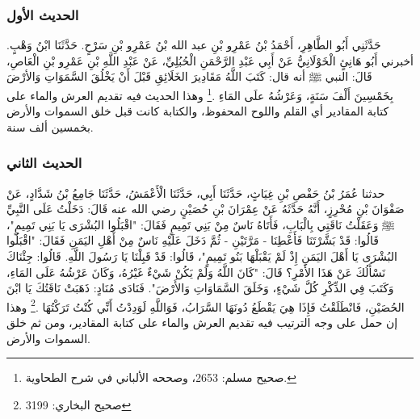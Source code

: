 \subsubsection{الحديث الأول}
\label{sec:app_first_creation_hadith_1}

حَدَّثَنِي أَبُو الطَّاهِرِ، أَحْمَدُ بْنُ عَمْرِو بْنِ عبد الله بْنُ عَمْرِو بْنِ سَرْحٍ. حَدَّثَنَا ابْنُ وَهْبٍ. أخبرني أَبُو هَانِئٍ الْخَوْلَانِيُّ عَنْ أَبِي عَبْدِ الرَّحْمَنِ الْحُبُلِيِّ، عَنْ عَبْدِ اللَّهِ بْنِ عَمْرِو بْنِ الْعَاصِ، قَالَ: النبي ﷺ أنه قال:  كَتَبَ اللَّهُ مَقَادِيرَ الخَلَائِقِ قَبْلَ أَنْ يَخْلُقَ السَّمَوَاتِ وَالأرْضَ بِخَمْسِينَ أَلْفَ سَنَةٍ، وَعَرْشُهُ علَى المَاءِ \href{https://shamela.ws/book/1727/6683#p2}{\faExternalLink} \cite{muslim}.\footnote{صحيح مسلم: 2653، وصححه الألباني في شرح الطحاوية.} وهذا الحديث فيه تقديم العرش والماء على كتابة المقادير أي القلم واللوح المحفوظ، والكتابة كانت قبل خلق السموات والأرض بخمسين ألف سنة.

\subsubsection{الحديث الثاني}
\label{sec:app_first_creation_hadith_2}

حدثنا عُمَرُ بْنُ حَفْصِ بْنِ غِيَاثٍ، حَدَّثَنَا أَبِي، حَدَّثَنَا الْأَعْمَشُ، حَدَّثَنَا جَامِعُ بْنُ شَدَّادٍ، عَنْ صَفْوَانَ بْنِ مُحْرِزٍ، أَنَّهُ حَدَّثَهُ عَنْ عِمْرَانَ بْنِ حُصَيْنٍ رضي الله عنه قَالَ: دَخَلْتُ عَلَى النَّبِيِّ ﷺ وَعَقَلْتُ نَاقَتِي بِالْبَابِ، فَأَتَاهُ نَاسٌ مِنْ بَنِي تَمِيمٍ فَقَالَ: "اقْبَلُوا البُشْرَى يَا بَنِي تَمِيمٍ"، قَالُوا: قَدْ بَشَّرْتَنَا فَأَعْطِنَا - مَرَّتَيْنِ - ثُمَّ دَخَلَ عَلَيْهِ نَاسٌ مِنْ أَهْلِ اليَمَنِ فَقَالَ: "اقْبَلُوا البُشْرَى يَا أَهْلَ اليَمَنِ إِذْ لَمْ يَقْبَلْهَا بَنُو تَمِيمٍ"، قَالُوا: قَدْ قَبِلْنَا يَا رَسُولَ اللَّهِ. قَالُوا: جِئْنَاكَ نَسْأَلُكَ عَنْ هَذَا الأَمْرِ؟ قَالَ: "كَانَ اللَّهُ وَلَمْ يَكُنْ شَيْءٌ غَيْرُهُ، وَكَانَ عَرْشُهُ عَلَى المَاءِ، وَكَتَبَ فِي الذِّكْرِ كُلَّ شَيْءٍ، وَخَلَقَ السَّمَاوَاتِ وَالأَرْضَ". فَنَادَى مُنَادٍ: ذَهَبَتْ نَاقَتُكَ يَا ابْنَ الحُصَيْنِ، فَانْطَلَقْتُ فَإِذَا هِيَ يَقْطَعُ دُونَهَا السَّرَابُ، فَوَاللَّهِ لَوَدِدْتُ أَنِّي كُنْتُ تَرَكْتُهَا \href{https://shamela.ws/book/1284/2020#p2}{\faExternalLink} \cite{bukhari}.\footnote{صحيح البخاري: 3199} وهذا إن حمل على وجه الترتيب فيه تقديم العرش والماء على كتابة المقادير، ومن ثم خلق السموات والأرض.

